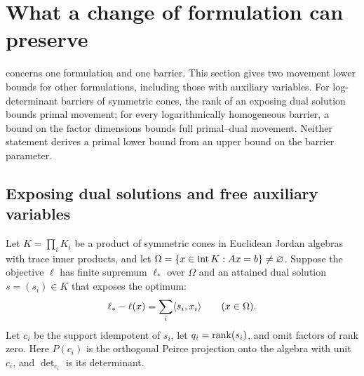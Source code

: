 \section{What a change of formulation can preserve}
\label{sec:formulation}

 concerns one formulation and one barrier. This
section gives two movement lower bounds for other formulations,
including those with auxiliary variables. For log-determinant barriers
of symmetric cones, the rank of an exposing dual solution bounds primal
movement; for every logarithmically homogeneous barrier, a bound on the
factor dimensions bounds full primal--dual movement. Neither statement derives a primal
lower bound from an upper bound on the barrier parameter.

\subsection{Exposing dual solutions and free auxiliary variables}
Let $K=\prod_iK_i$ be a product of symmetric cones in Euclidean Jordan
algebras with trace inner products, and let
$\Omega=\{x\in\operatorname{int} K:Ax=b\}\ne\varnothing$.
Suppose the objective $\ell$ has finite supremum $\ell_*$ over
$\Omega$ and an attained dual solution $s=(s_i)\in K$ that exposes
the optimum:
\begin{equation}
 \ell_*-\ell(x)=\sum_i\langle s_i,x_i\rangle\qquad(x\in\Omega).
 \label{eq:exposing-certificate}
\end{equation}
Let $c_i$ be the support idempotent of $s_i$, let
$q_i=\operatorname{rank}(s_i)$, and omit factors of rank zero.
Here $P(c_i)$ is the orthogonal Peirce projection onto the algebra with
unit $c_i$, and $\det_{c_i}$ is its determinant.

